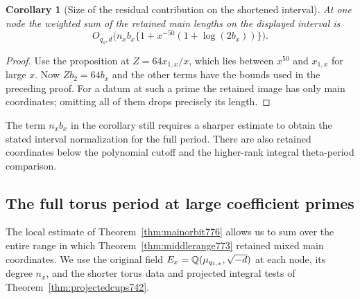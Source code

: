 \documentclass[a4paper,11pt]{article}
\newtheorem{corollary}[proposition]{Corollary}
\theoremstyle{definition}
\theoremstyle{remark}
\numberwithin{equation}{section}
\begin{document}
\begin{corollary}[Size of the residual contribution on the shortened interval]
\leavevmode\label{cor:coarsemixed773}
At one node the weighted sum of the retained main lengths
on the displayed interval is
\[
       O_{q_0,d}\big(n_x b_x\{1+x^{-50}(1+\log(2b_x))\}\big).
\]
\end{corollary}
\begin{proof}
Use the proposition at \(Z=64x_{1,x}/x\), which lies
between \(x^{50}\) and \(x_{1,x}\) for large \(x\).
Now \(Z b_2=64 b_x\) and the other terms have the bounds
used in the preceding proof. For a datum at such a prime
the retained image has only main coordinates; omitting
all of them drops precisely its length.
\end{proof}
The term \(n_x b_x\) in the corollary still requires a
sharper estimate to obtain the stated interval normalization
for the full period. There are also retained coordinates
below the polynomial cutoff and the higher-rank integral
theta-period comparison.
\clearpage

\subsection{The full torus period at large coefficient primes}
\label{sec:fulltoruslarge777}
The local estimate of Theorem~\ref{thm:mainorbit776}
allows us to sum over the entire range in which
Theorem~\ref{thm:middlerange773} retained mixed main
coordinates. We use the original field
\(E_x=\mathbb Q(\mu_{q_{1,x}},\sqrt{-d})\) at each node, its
degree \(n_x\), and the shorter torus data and projected
integral tests of Theorem~\ref{thm:projectedcups742}.
\end{document}
